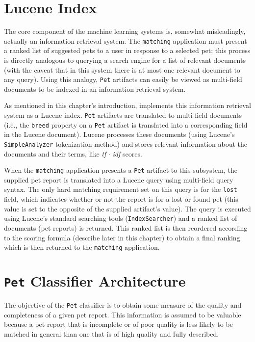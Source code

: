 \section {Lucene Index}

The core component of the machine learning systems is, somewhat misleadingly, actually an information retrieval system.  The {\tt matching} application must present a ranked list of suggested pets to a user in response to a selected pet; this process is directly analogous to querying a search engine for a list of relevant documents (with the caveat that in this system there is at most one relevant document to any query).  Using this analogy, {\tt Pet} artifacts can easily be viewed as multi-field documents to be indexed in an information retrieval system.

As mentioned in this chapter's introduction, \nplh{} implements this information retrieval system as a Lucene index.  {\tt Pet} artifacts are translated to multi-field documents (i.e., the {\tt breed} property on a {\tt Pet} artifact is translated into a corresponding field in the Lucene document).  Lucene processes these documents (using Lucene's {\tt SimpleAnalyzer} tokenization method) and stores relevant information about the documents and their terms, like {\em tf} $\cdot$ {\em idf} scores.  

When the {\tt matching} application presents a {\tt Pet} artifact to this subsystem, the supplied pet report is translated into a Lucene query using multi-field query syntax.  The only hard matching requirement set on this query is for the {\tt lost} field, which indicates whether or not the report is for a lost or found pet (this value is set to the opposite of the supplied artifact's value).  The query is executed using Lucene's standard searching tools ({\tt IndexSearcher}) and a ranked list of documents (pet reports) is returned.  This ranked list is then reordered according to the scoring formula (describe later in this chapter) to obtain a final ranking which is then returned to the {\tt matching} application.

\section {{\tt Pet} Classifier Architecture}

The objective of the {\tt Pet} classifier is to obtain some measure of the quality and completeness of a given pet report.  This information is assumed to be valuable because a pet report that is incomplete or of poor quality is less likely to be matched in general than one that is of high quality and fully described.  

